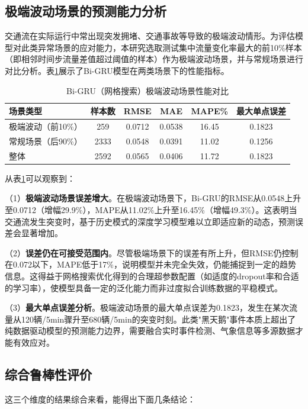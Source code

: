 \documentclass[12pt,a4paper,oneside]{ctexbook}
\begin{document}
	\subsection{极端波动场景的预测能力分析}
	
	交通流在实际运行中常出现突发拥堵、交通事故等导致的极端波动情形。为评估模型对此类异常场景的应对能力，本研究选取测试集中流量变化率最大的前10\%样本（即相邻时间步流量差值超过阈值的样本）作为极端波动场景，并与常规场景进行对比分析。表\ref{tab:extreme}展示了Bi-GRU模型在两类场景下的性能指标。
	
	\begin{table}[H]
		\centering
		\caption{Bi-GRU（网格搜索）极端波动场景性能对比}
		\label{tab:extreme}
		\begin{tabular}{lccccc}
			\toprule
			场景类型 & 样本数 & RMSE & MAE & MAPE\% & 最大单点误差 \\
			\midrule
			极端波动（前10\%） & 259 & 0.0712 & 0.0538 & 16.45 & 0.1823 \\
			常规场景（后90\%） & 2333 & 0.0548 & 0.0391 & 11.02 & 0.1256 \\
			整体               & 2592 & 0.0565 & 0.0406 & 11.72 & 0.1823 \\
			\bottomrule
		\end{tabular}
	\end{table}
	
	从表\ref{tab:extreme}可以观察到：
	
	（1）\textbf{极端波动场景误差增大}。在极端波动场景下，Bi-GRU的RMSE从0.0548上升至0.0712（增幅29.9\%），MAPE从11.02\%上升至16.45\%（增幅49.3\%）。这表明当交通流发生突变时，基于历史模式的深度学习模型难以立即适应新的动态，预测误差会显著增加。
	
	（2）\textbf{误差仍在可接受范围内}。尽管极端场景下的误差有所上升，但RMSE仍控制在0.072以下，MAPE低于17\%，说明模型并未完全失效，仍能捕捉到一定的趋势信息。这得益于网格搜索优化得到的合理超参数配置（如适度的dropout率和合适的学习率），使模型具备一定的泛化能力而非过度拟合训练数据的平稳模式。
	
	（3）\textbf{最大单点误差分析}。极端波动场景的最大单点误差为0.1823，发生在某次流量从120辆/5min骤升至680辆/5min的突变时刻。此类"黑天鹅"事件本质上超出了纯数据驱动模型的预测能力边界，需要融合实时事件检测、气象信息等多源数据才能有效应对。
	
	\subsection{综合鲁棒性评价}
	
	这三个维度的结果综合来看，能得出下面几条结论：
	
\end{document}
